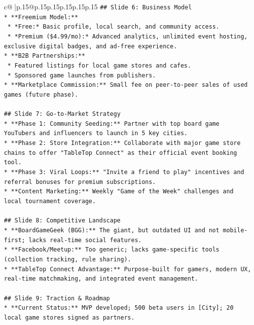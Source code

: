 \documentclass{article}
\begin{document}
{\begin{supertabular}{c@{$\;$}|p{.15\linewidth}@{}p{.15\linewidth}p{.15\linewidth}p{.15\linewidth}p{.15\linewidth}p{.15\linewidth}}
{{{\texttt{\#\# Slide 6: Business Model} \\
\texttt{*   **Freemium Model:**} \\
\texttt{    *   *Free:* Basic profile, local search, and community access.} \\
\texttt{    *   *Premium (\$4.99/mo):* Advanced analytics, unlimited event hosting, exclusive digital badges, and ad{-}free experience.} \\
\texttt{*   **B2B Partnerships:**} \\
\texttt{    *   Featured listings for local game stores and cafes.} \\
\texttt{    *   Sponsored game launches from publishers.} \\
\texttt{*   **Marketplace Commission:** Small fee on peer{-}to{-}peer sales of used games (future phase).} \\
\\ 
\texttt{\#\# Slide 7: Go{-}to{-}Market Strategy} \\
\texttt{*   **Phase 1: Community Seeding:** Partner with top board game YouTubers and influencers to launch in 5 key cities.} \\
\texttt{*   **Phase 2: Store Integration:** Collaborate with major game store chains to offer "TableTop Connect" as their official event booking tool.} \\
\texttt{*   **Phase 3: Viral Loops:** "Invite a friend to play" incentives and referral bonuses for premium subscriptions.} \\
\texttt{*   **Content Marketing:** Weekly "Game of the Week" challenges and local tournament coverage.} \\
\\ 
\texttt{\#\# Slide 8: Competitive Landscape} \\
\texttt{*   **BoardGameGeek (BGG):** The giant, but outdated UI and not mobile{-}first; lacks real{-}time social features.} \\
\texttt{*   **Facebook/Meetup:** Too generic; lacks game{-}specific tools (collection tracking, rule sharing).} \\
\texttt{*   **TableTop Connect Advantage:** Purpose{-}built for gamers, modern UX, real{-}time matchmaking, and integrated event management.} \\
\\ 
\texttt{\#\# Slide 9: Traction \& Roadmap} \\
\texttt{*   **Current Status:** MVP developed; 500 beta users in {[}City{]}; 20 local game stores signed as partners.} \\
}}}
\end{supertabular}}
\end{document}
